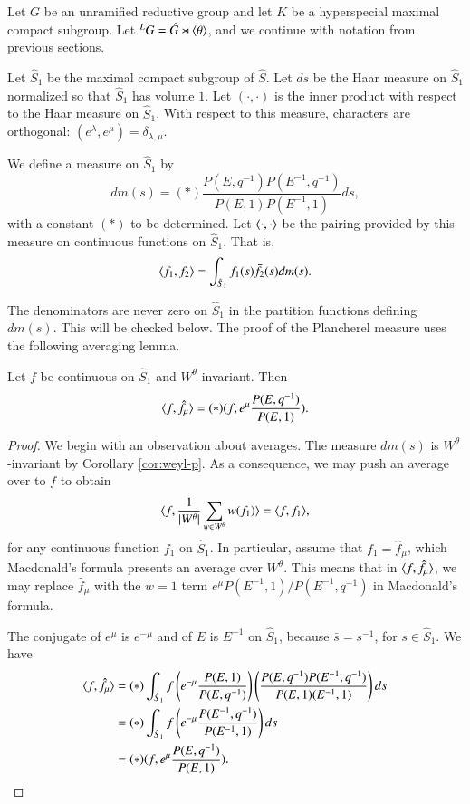 Let $G$ be an unramified reductive group and let $K$ be a hyperspecial maximal compact subgroup.
Let ${}^LG = \hat G\rtimes \langle{\theta}\rangle$, and we continue with notation from previous sections.

Let $\hat S_1$ be the maximal compact subgroup of $\hat S$.  Let $ds$ be the Haar measure on $\hat S_1$ normalized
so that $\hat S_1$ has volume $1$.
Let $(\cdot,\cdot)$ is the inner product with respect to the Haar  measure on $\hat S_1$.
With respect to this measure, characters are orthogonal: $(e^\lambda,e^\mu) = \delta_{\lambda,\mu}$.  


We define a measure on $\hat S_1$ by
\[
dm(s) = (*)\frac{P(E,q^{-1}) P(E^{-1},q^{-1})}{P(E,1) P(E^{-1},1)} ds,
\]
with a constant $(*)$ to be determined.
Let $\langle{\cdot,\cdot}\rangle$ be the pairing provided by this measure on continuous functions on $\hat S_1$.
That is, 
\[
\langle{f_1,f_2}\rangle = \int_{\hat S_1} f_1(s) \bar f_2(s) dm(s).
\]

The denominators are never zero on $\hat S_1$ in the partition functions defining 
$dm(s)$.  This will be checked below.
The proof of the Plancherel measure uses the following averaging lemma.

\begin{lemma}\label{lemma:average} 
Let $f$ be continuous on $\hat S_1$ and $W^\theta$-invariant.
Then
\[
\langle{f,\hat f_\mu}\rangle = (*) (f, e^\mu\frac{ P(E,q^{-1})}{P(E,1)}).
\]
\end{lemma}

\begin{proof}
We begin with an observation about averages.
The  measure $dm(s)$ is $W^\theta$-invariant by Corollary \ref{cor:weyl-p}.  As a consequence,
we may push an average over to $f$ to obtain
\begin{equation}\label{eqn:inv}
\langle{f,\frac{1}{|W^\theta|}\sum_{w\in W^\theta} w(f_1)}\rangle = \langle{f,f_1}\rangle,
\end{equation}
for any continuous function $f_1$ on $\hat S_1$.
In particular, assume that $f_1=\hat f_\mu$, which Macdonald's
formula presents an average over $W^\theta$.
This means that in $\langle{f,\hat f_\mu}\rangle$, we may replace 
$\hat f_\mu$  with
the $w=1$ term $e^{\mu} P(E^{-1},1)/{P(E^{-1},q^{-1})}$ in Macdonald's formula.

The conjugate of $e^\mu$ is $e^{-\mu}$ and of $E$ is $E^{-1}$ on $\hat S_1$, because $\bar s = s^{-1}$, for $s\in \hat S_1$.
We have
\begin{align*}
\langle{f,\hat f_\mu}\rangle &=
(*)\int_{\hat S_1} f \left(e^{-\mu} \frac{P(E,1)}{P(E,q^{-1})}\right) \left(\frac{P(E,q^{-1}) P(E^{-1},q^{-1})}{P(E,1)(E^{-1},1)}\right) ds\\
&=
(*)\int_{\hat S_1} f \left(e^{-\mu} \frac{P(E^{-1},q^{-1})}{P(E^{-1},1)}\right) ds\\
&=
(*) (f, e^\mu\frac{ P(E,q^{-1})}{P(E,1)}).
\end{align*}
\end{proof}

